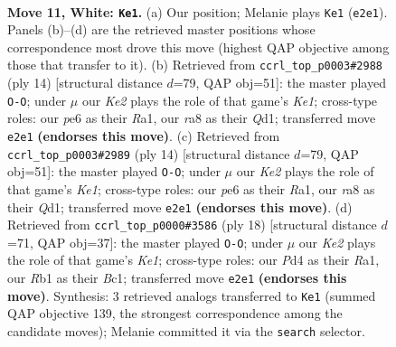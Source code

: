 \documentclass[11pt]{article}
\begin{document}
\clearpage

\begin{figure}[p]\centering
\begin{subfigure}{0.46\textwidth}\centering
\resizebox{\linewidth}{!}{%
\newchessgame
\chessboard[
  setfen={rnb1k1r1/pp1qbp1p/4p1p1/2Pp3n/3P4/2N5/PP1NKPPP/1RBQ1B1R w q - 2 11},
  showmover=false,
  pgfstyle=straightmove, color=movearrow, markmove={e2-e1}
]}
\caption{}
\end{subfigure}\hfill
\begin{subfigure}{0.46\textwidth}\centering
\resizebox{\linewidth}{!}{%
\newchessgame
\chessboard[
  setfen={rn1qkb1r/pb3ppp/1p1ppn2/8/2PNP3/2N5/PP2BPPP/R1BQK2R w KQkq - 2 8},
  showmover=false,
  pgfstyle=straightmove, color=movearrow, markmove={e1-g1}
]}
\caption{}
\end{subfigure}
\\[4pt]
\begin{subfigure}{0.46\textwidth}\centering
\resizebox{\linewidth}{!}{%
\newchessgame
\chessboard[
  setfen={rn1qkb1r/pb3ppp/1p1ppn2/8/2PNP3/2N5/PP2BPPP/R1BQK2R w KQkq - 2 8},
  showmover=false,
  pgfstyle=straightmove, color=movearrow, markmove={e1-g1}
]}
\caption{}
\end{subfigure}\hfill
\begin{subfigure}{0.46\textwidth}\centering
\resizebox{\linewidth}{!}{%
\newchessgame
\chessboard[
  setfen={rnbq1rk1/pp3ppp/1b1p1n2/4p3/2P5/2NNP3/PP2BPPP/R1BQK2R w KQ - 4 10},
  showmover=false,
  pgfstyle=straightmove, color=movearrow, markmove={e1-g1}
]}
\caption{}
\end{subfigure}
\caption{\textbf{Move 11, White: \texttt{Ke1}.} (a) Our position; Melanie plays \texttt{Ke1} (\texttt{e2e1}). Panels (b)--(d) are the retrieved master positions whose correspondence most drove this move (highest QAP objective among those that transfer to it). (b) Retrieved from \texttt{ccrl\_top\_p0003\#2988} (ply 14) [structural distance $d$=79, QAP obj=51]: the master played \texttt{O-O}; under $\mu$ our \emph{Ke2} plays the role of that game's \emph{Ke1}; cross-type roles: our \emph{p}e6 as their \emph{R}a1, our \emph{r}a8 as their \emph{Q}d1; transferred move \texttt{e2e1} \textbf{(endorses this move)}. (c) Retrieved from \texttt{ccrl\_top\_p0003\#2989} (ply 14) [structural distance $d$=79, QAP obj=51]: the master played \texttt{O-O}; under $\mu$ our \emph{Ke2} plays the role of that game's \emph{Ke1}; cross-type roles: our \emph{p}e6 as their \emph{R}a1, our \emph{r}a8 as their \emph{Q}d1; transferred move \texttt{e2e1} \textbf{(endorses this move)}. (d) Retrieved from \texttt{ccrl\_top\_p0000\#3586} (ply 18) [structural distance $d$=71, QAP obj=37]: the master played \texttt{O-O}; under $\mu$ our \emph{Ke2} plays the role of that game's \emph{Ke1}; cross-type roles: our \emph{P}d4 as their \emph{R}a1, our \emph{R}b1 as their \emph{B}c1; transferred move \texttt{e2e1} \textbf{(endorses this move)}. Synthesis: 3 retrieved analogs transferred to \texttt{Ke1} (summed QAP objective 139, the strongest correspondence among the candidate moves); Melanie committed it via the \texttt{search} selector.}
\label{fig:thought-m20}
\end{figure}
\end{document}

